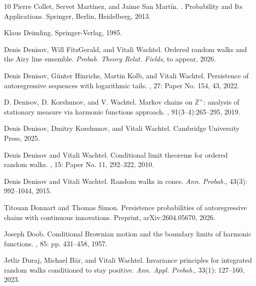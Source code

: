 \documentclass[12pt]{article}
\newcommand{\1}{\mathds{1}}
\theoremstyle{definition}
\theoremstyle{plain}
\theoremstyle{remark}
\begin{document}
\begin{thebibliography}{10}
Pierre Collet, Servet Mart{\'i}nez, and Jaime San Mart{\'i}n.
.
\newblock Probability and Its Applications. Springer, Berlin, Heidelberg, 2013.


Klaus Deimling.
 Springer-Verlag, 1985.

Denis Denisov, Will FitzGerald, and Vitali Wachtel.
\newblock Ordered random walks and the Airy line ensemble. {\em Probab. Theory Relat. Fields}, to appear, 2026.

Denis Denisov, G\"unter Hinrichs, Martin Kolb, and Vitali Wachtel.
\newblock Persistence of autoregressive sequences with logarithmic tails.
, 27: Paper No. 154, 43, 2022.

D. Denisov, D. Korshunov, and V. Wachtel.
\newblock Markov chains on $\mathbb{Z}^+$: analysis of stationary measure via
harmonic functions approach.
, 91(3--4):265--295, 2019.

Denis Denisov, Dmitry Korshunov, and Vitali Wachtel.
 Cambridge University Press, 2025.

Denis Denisov and Vitali Wachtel.
\newblock Conditional limit theorems for ordered random walks. 
, 15: Paper No. 11, 292--322, 2010.

Denis Denisov and Vitali Wachtel.
\newblock Random walks in cones. {\em Ann. Probab.}, 43(3): 992--1044, 2015.

 Titouan Donnart and Thomas Simon.
 \newblock Persistence probabilities of autoregressive chains with continuous innovations. Preprint, arXiv:2604.05670, 2026.

Joseph Doob.
\newblock Conditional Brownian motion and the boundary limits of harmonic functions. 
, 85: pp. 431--458, 1957.

Jetlir Duraj, Michael B\"ar, and Vitali Wachtel.
\newblock Invariance principles for integrated random walks conditioned to stay positive. {\em Ann. Appl. Probab.}, 33(1): 127--160, 2023.


\end{thebibliography}
\end{document}
